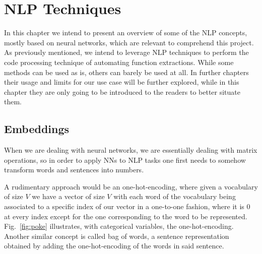 

\chapter{NLP Techniques}
In this chapter we intend to present an overview of some of the NLP concepts, mostly based on neural networks, which are relevant to comprehend this project. As previously mentioned, we intend to leverage NLP techniques to perform the code processing technique of automating function extractions. While some methods can be used as is, others can barely be used at all. In further chapters their usage and limits for our use case will be further explored, while in this chapter they are only going to be introduced to the readers to better situate them.

\section{Embeddings}

When we are dealing with neural networks, we are essentially dealing with matrix operations, so in order to apply NNs to NLP tasks one first needs to somehow transform words and sentences into numbers.


A rudimentary approach would be an one-hot-encoding, where given a vocabulary of size $V$ we have a vector of size $V$ with each word of the vocabulary being associated to a specific index of our vector in a one-to-one fashion, where it is 0 at every index except for the one corresponding to the word to be represented. Fig.~\ref{fig:poke} illustrates, with categorical variables, the one-hot-encoding. Another similar concept is called bag of words, a sentence representation obtained by adding the one-hot-encoding of the words in said sentence.


